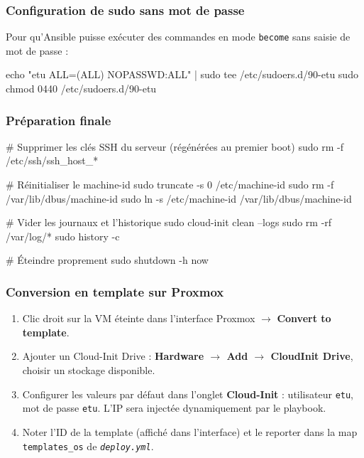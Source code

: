 \documentclass[a4paper]{article}
\newcommand{\cmd}[1]{\texttt{#1}}
\newcommand{\file}[1]{\texttt{\textit{#1}}}
\begin{document}
\subsubsection*{Configuration de sudo sans mot de passe}

Pour qu'Ansible puisse exécuter des commandes en mode \cmd{become} sans saisie de mot de passe :

\begin{bashcode}
echo "etu ALL=(ALL) NOPASSWD:ALL" | sudo tee /etc/sudoers.d/90-etu
sudo chmod 0440 /etc/sudoers.d/90-etu
\end{bashcode}

\subsubsection*{Préparation finale}

\begin{bashcode}
# Supprimer les clés SSH du serveur (régénérées au premier boot)
sudo rm -f /etc/ssh/ssh_host_*

# Réinitialiser le machine-id
sudo truncate -s 0 /etc/machine-id
sudo rm -f /var/lib/dbus/machine-id
sudo ln -s /etc/machine-id /var/lib/dbus/machine-id

# Vider les journaux et l'historique
sudo cloud-init clean --logs
sudo rm -rf /var/log/*
sudo history -c

# Éteindre proprement
sudo shutdown -h now
\end{bashcode}

\subsubsection*{Conversion en template sur Proxmox}

\begin{enumerate}
  \item Clic droit sur la VM éteinte dans l'interface Proxmox \(\to\) \textbf{Convert to template}.
  \item Ajouter un Cloud-Init Drive : \textbf{Hardware \(\to\) Add \(\to\) CloudInit Drive}, choisir un stockage disponible.
  \item Configurer les valeurs par défaut dans l'onglet \textbf{Cloud-Init} : utilisateur \cmd{etu}, mot de passe \cmd{etu}. L'IP sera injectée dynamiquement par le playbook.
  \item Noter l'ID de la template (affiché dans l'interface) et le reporter dans la map \cmd{templates\_os} de \file{deploy.yml}.
\end{enumerate}
\end{document}
